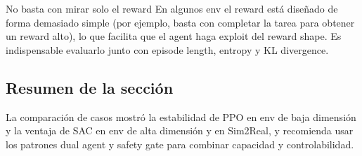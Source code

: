 \begin{warningbox}{No basta con mirar solo el reward}
En algunos env el reward está diseñado de forma demasiado simple (por ejemplo, basta con completar la tarea para obtener un reward alto), lo que facilita que el agent haga exploit del reward shape. Es indispensable evaluarlo junto con episode length, entropy y KL divergence.
\end{warningbox}

\subsection{Resumen de la sección}

La comparación de casos mostró la estabilidad de PPO en env de baja dimensión y la ventaja de SAC en env de alta dimensión y en Sim2Real, y recomienda usar los patrones dual agent y safety gate para combinar capacidad y controlabilidad.

